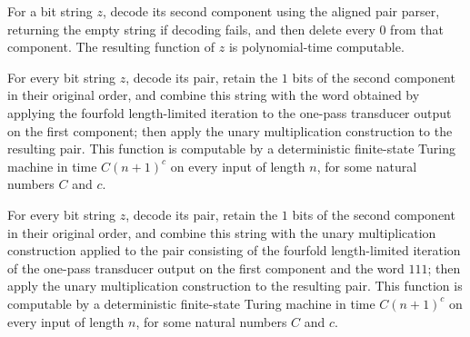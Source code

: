 \begin{theorem}
\label{Randomized.polyTimeComputable_onesW_snd}
\leanok
{}
For a bit string $z$, decode its second component using the aligned pair parser,
returning the empty string if decoding fails, and then delete every $0$ from that
component. The resulting function of $z$ is polynomial-time computable.
\end{theorem}

\begin{theorem}
\label{Randomized.polyTimeComputable_hcCD}
\leanok
{}
For every bit string $z$, decode its pair, retain the $1$ bits of the second component
in their original order, and combine this string with the word obtained by applying the
fourfold length-limited iteration to the one-pass transducer output on the first
component; then apply the unary multiplication construction to the resulting pair. This
function is computable by a deterministic finite-state Turing machine in time $C(n+1)^c$
on every input of length $n$, for some natural numbers $C$ and $c$.
\end{theorem}

\begin{theorem}
\label{Randomized.polyTimeComputable_hcCD3}
\leanok
{}
For every bit string $z$, decode its pair, retain the $1$ bits of the second component
in their original order, and combine this string with the unary multiplication
construction applied to the pair consisting of the fourfold length-limited iteration of
the one-pass transducer output on the first component and the word $111$; then apply the
unary multiplication construction to the resulting pair. This function is computable by
a deterministic finite-state Turing machine in time $C(n+1)^c$ on every input of length
$n$, for some natural numbers $C$ and $c$.
\end{theorem}

